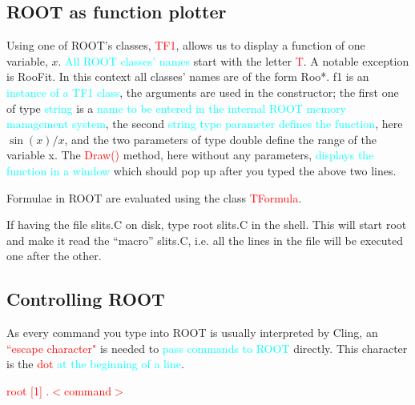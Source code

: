 \documentclass[12pt,a4paper]{article}
\begin{document}
\subsection{ROOT as function plotter}
Using one of ROOT’s classes, \textcolor{red}{TF1}, allows us to display a function of one variable, $x$. \textcolor{cyan}{All ROOT classes' names} start with the letter \textcolor{red}{T}. A notable exception is RooFit. In this context all classes’ names are of the form Roo*. f1 is an \textcolor{cyan}{instance of a TF1 class}, the arguments are used in the constructor; the first one of type \textcolor{cyan}{string} is a \textcolor{cyan}{name to be entered in the internal ROOT memory management system}, the second \textcolor{cyan}{string type parameter defines the function}, here $\sin(x)/x$, and the two parameters of type double define the range of the variable x. The \textcolor{red}{Draw()} method, here without any parameters, \textcolor{cyan}{displays the function in a window} which should pop up after you typed the above two lines.

Formulae in ROOT are evaluated using the class \textcolor{red}{TFormula}.

If having the file slits.C on disk, type root slits.C in the shell. This will start root and make it read the “macro” slits.C, i.e. all the lines in the file will be executed one after the other.

\subsection{Controlling ROOT}
As every command you type into ROOT is usually interpreted by Cling, an \textcolor{red}{``escape character"} is needed to \textcolor{cyan}{pass commands to ROOT} directly. This character is the \textcolor{red}{dot} \textcolor{cyan}{at the beginning of a line}.

\textcolor{red}{root [1]  .$<$command$>$}
\end{document}
